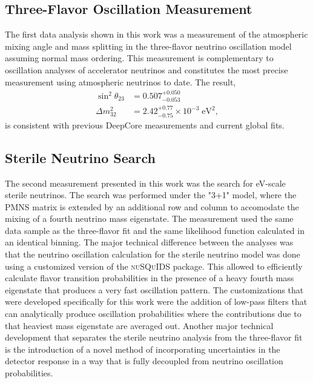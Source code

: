 \subsection{Three-Flavor Oscillation Measurement}
\label{sec:summary-three-flavor}

The first data analysis shown in this work was a measurement of the atmospheric mixing angle and mass splitting in the three-flavor neutrino oscillation model assuming normal mass ordering.
This measurement is complementary to oscillation analyses of accelerator neutrinos and constitutes the most precise measurement using atmospheric neutrinos to date.
The result,
\begin{align*}
    \sin^2\theta_{23} &= 0.507_{-0.053}^{+0.050}\\
    \Delta m^2_{32} &= 2.42_{-0.75}^{+0.77} \times10^{-3}\;\mathrm{eV}^2,
\end{align*}
is consistent with previous DeepCore measurements and current global fits.

\subsection{Sterile Neutrino Search}
\label{sec:summary-sterile-osc}

The second measurement presented in this work was the search for eV-scale sterile neutrinos.
The search was performed under the "3+1" model, where the PMNS matrix is extended by an additional row and column to accomodate the mixing of a fourth neutrino mass eigenstate.
The measurement used the same data sample as the three-flavor fit and the same likelihood function calculated in an identical binning.
The major technical difference between the analyses was that the neutrino oscillation calculation for the sterile neutrino model was done using a customized version of the \textsc{nuSQuIDS} package.
This allowed to efficiently calculate flavor transition probabilities in the presence of a heavy fourth mass eigenstate that produces a very fast oscillation pattern.
The customizations that were developed specifically for this work were the addition of low-pass filters that can analytically produce oscillation probabilities where the contributions due to that heaviest mass eigenstate are averaged out.
Another major technical development that separates the sterile neutrino analysis from the three-flavor fit is the introduction of a novel method of incorporating uncertainties in the detector response in a way that is fully decoupled from neutrino oscillation probabilities.

